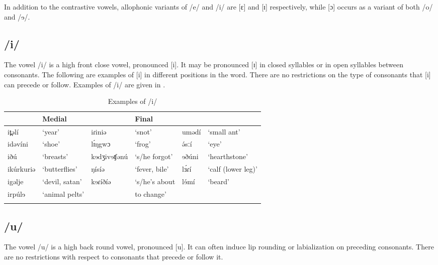In addition to the contrastive vowels, allophonic variants of /e/ and /i/ are [ɛ] and [ɪ] respectively, while [ɔ] occurs as a variant of both /o/ and /ɘ/. 

\subsection{/i/}
The vowel /i/ is a high front close vowel, pronounced [i]. It may be pronounced [ɪ] in closed syllables or in open syllables between consonants. The following are examples of [i] in different positions in the word. There are no restrictions on the type of consonants that [i] can precede or follow. Examples of /i/ are given in .

\begin{table} 
\caption{Examples of /i/}	
 \label{tab:ch2:3}
\begin{tabular}[t]{lp{2cm}lp{2cm}lp{2cm}}
\lsptoprule
\multicolumn{2}{l}{Initial} &  \multicolumn{2}{l}{Medial}	 &	\multicolumn{2}{l}{Final}  \\
\midrule
it̪əlí 	& 	‘year’ 	&  iɾiniə	& ‘snot’ &	umədí   &	‘small ant’\\
idəvíni	& 	‘shoe’	&  lɪ́ŋgwɔ	& ‘frog’ & ə́sːí	& ‘eye’\\
iðú		& ‘breasts’	&  kɘdʒivɘʧənú &	‘s/he forgot’ & ɘðúni	&‘hearthstone’ \\
ikúrkuriə &	‘butterflies’	&  ŋísíə &	‘fever, bile’ & lɜ́ɾí &	‘calf (lower leg)’\\
igəlje	& ‘devil, satan’	& 	kɘɾíðíə	&	‘s/he's about &  lɘ́mí &	‘beard’\\
irpúlɘ	& ‘animal pelts’ & & to change’ & & 		\\

\lspbottomrule	
\end{tabular}
\end{table}


		
\subsection{/u/}
The vowel /u/ is a high back round vowel, pronounced [u]. It can often induce lip rounding or labialization on preceding consonants. There are no restrictions with respect to consonants that precede or follow it.


